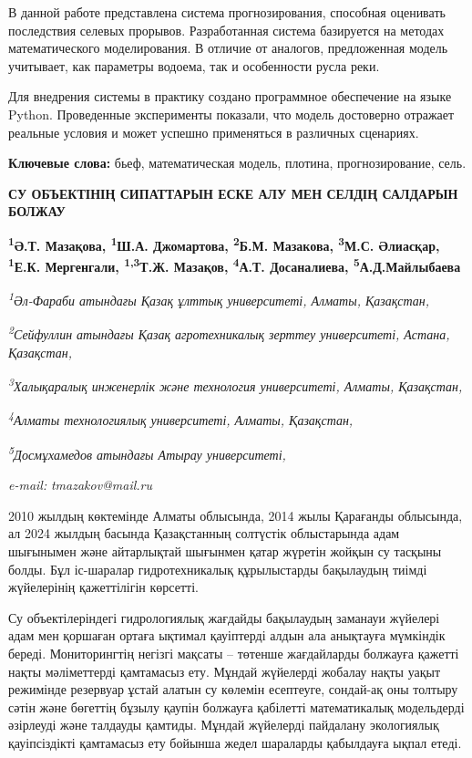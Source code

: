 В данной работе представлена система прогнозирования, способная
оценивать последствия селевых прорывов. Разработанная система базируется
на методах математического моделирования. В отличие от аналогов,
предложенная модель учитывает, как параметры водоема, так и особенности
русла реки.

Для внедрения системы в практику создано программное обеспечение на
языке Python. Проведенные эксперименты показали, что модель достоверно
отражает реальные условия и может успешно применяться в различных
сценариях.

{\bfseries Ключевые слова:} бьеф, математическая модель, плотина,
прогнозирование, сель.

\begin{articleheader}
{\bfseries СУ ОБЪЕКТІНІҢ СИПАТТАРЫН ЕСКЕ АЛУ МЕН СЕЛДІҢ САЛДАРЫН БОЛЖАУ}

{\bfseries
\textsuperscript{1}Ә.Т. Мазақова,
\textsuperscript{1}Ш.А. Джомартова,
\textsuperscript{2}Б.М. Мазакова,
\textsuperscript{3}М.С. Әлиасқар,
\textsuperscript{1}Е.К. Мергенгали,
\textsuperscript{1,3}Т.Ж. Мазақов,
\textsuperscript{4}А.Т. Досаналиева,
\textsuperscript{5}А.Д.Майлыбаева}
\end{articleheader}

\begin{affiliation}
\emph{\textsuperscript{1}Әл-Фараби атындағы Қазақ ұлттық университеті, Алматы, Қазақстан,}

\emph{\textsuperscript{2}Сейфуллин атындағы Қазақ агротехникалық зерттеу университеті, Астана, Қазақстан,}

\emph{\textsuperscript{3}Халықаралық инженерлік және технология университеті, Алматы, Қазақстан,}

\emph{\textsuperscript{4}Алматы технологиялық университеті, Алматы, Қазақстан,}

\emph{\textsuperscript{5}Досмұхамедов атындағы Атырау университеті,}

\emph{e-mail:} \emph{tmazakov@mail.ru}
\end{affiliation}

2010 жылдың көктемінде Алматы облысында, 2014 жылы Қарағанды
\hspace{0pt}\hspace{0pt}облысында, ал 2024 жылдың басында Қазақстанның
солтүстік облыстарында адам шығынымен және айтарлықтай шығынмен қатар
жүретін жойқын су тасқыны болды. Бұл іс-шаралар гидротехникалық
құрылыстарды бақылаудың тиімді жүйелерінің қажеттілігін көрсетті.

Су объектілеріндегі гидрологиялық жағдайды бақылаудың заманауи жүйелері
адам мен қоршаған ортаға ықтимал қауіптерді алдын ала анықтауға
мүмкіндік береді. Мониторингтің негізгі мақсаты -- төтенше жағдайларды
болжауға қажетті нақты мәліметтерді қамтамасыз ету. Мұндай жүйелерді
жобалау нақты уақыт режимінде резервуар ұстай алатын су көлемін
есептеуге, сондай-ақ оны толтыру сәтін және бөгеттің бұзылу қаупін
болжауға қабілетті математикалық модельдерді әзірлеуді және талдауды
қамтиды. Мұндай жүйелерді пайдалану экологиялық қауіпсіздікті қамтамасыз
ету бойынша жедел шараларды қабылдауға ықпал етеді.

